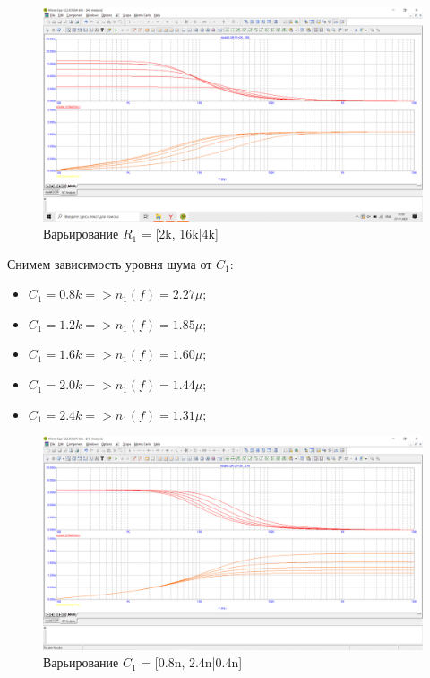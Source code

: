 \documentclass[a4paper, 12pt]{article}%
\begin{document}
\begin{figure}[h!]
    \centering
    \includegraphics[scale = 0.4 \textwidth]{images/mod3_1_3.png}
    \caption{Варьирование $R_1$ = [2k, 16k|4k]}
    \label{fig:m313}
\end{figure}

Снимем зависимость уровня шума от $C_1$:
\begin{itemize}
    \item $C_1 = 0.8k => n_1(f) = 2.27\mu$;
    \item $C_1 = 1.2k => n_1(f) = 1.85\mu$;
    \item $C_1 = 1.6k => n_1(f) = 1.60\mu$;
    \item $C_1 = 2.0k => n_1(f) = 1.44\mu$;
    \item $C_1 = 2.4k => n_1(f) = 1.31\mu$;
\end{itemize}

\begin{figure}[h!]
    \centering
    \includegraphics[scale = 0.4 \textwidth]{images/mod3_1_4.png}
    \caption{Варьирование $C_1$ = [0.8n, 2.4n|0.4n]}
    \label{fig:m314}
\end{figure}
\end{document}
